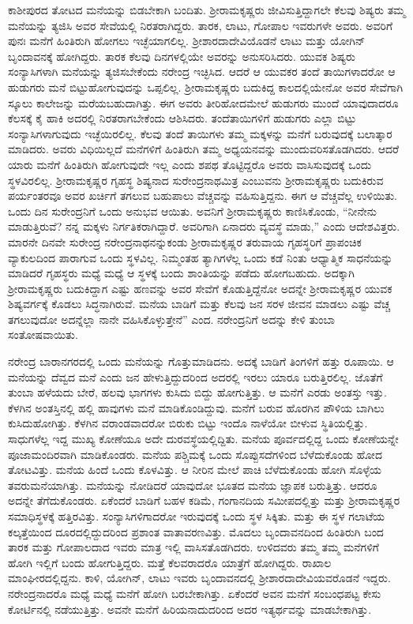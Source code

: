 ಕಾಶೀಪುರದ ತೋಟದ ಮನೆಯನ್ನು ಬಿಡಬೇಕಾಗಿ ಬಂದಿತು. ಶ‍್ರೀರಾಮಕೃಷ್ಣರು ಜೀವಿಸುತ್ತಿದ್ದಾಗಲೇ ಕೆಲವು ಶಿಷ್ಯರು ತಮ್ಮ ಮನೆಯನ್ನು ತ್ಯಜಿಸಿ ಅವರ ಸೇವೆಯಲ್ಲಿ ನಿರತರಾಗಿದ್ದರು. ತಾರಕ, ಲಾಟು, ಗೋಪಾಲ ಇವರುಗಳೇ ಅವರು. ಅವರಿಗೆ ಪುನಃ ಮನೆಗೆ ಹಿಂತಿರುಗಿ ಹೋಗಲು ಇಚ್ಛೆಯಾಗಲಿಲ್ಲ. ಶ‍್ರೀಶಾರದಾದೇವಿಯೊಡನೆ ಲಾಟು ಮತ್ತು ಯೋಗಿನ್ ಬೃಂದಾವನಕ್ಕೆ ಹೋಗಿದ್ದರು. ತಾರಕ ಕೆಲವು ದಿನಗಳಲ್ಲಿಯೇ ಅವರನ್ನು ಅನುಸರಿಸಿದರು. ಯುವಕ ಶಿಷ್ಯರು ಸಂನ್ಯಾಸಿಗಳಾಗಿ ಮನೆಯನ್ನು ತ್ಯಜಿಸಬೇಕೆಂದು ನರೇಂದ್ರ ಇಚ್ಛಿಸಿದ. ಆದರೆ ಆ ಯುವಕರ ತಂದೆ ತಾಯಿಗಳಾದರೋ ಆ ಹುಡುಗರು ಮನೆ ಬಿಟ್ಟುಹೋಗುವುದನ್ನು ಒಪ್ಪಲಿಲ್ಲ. ಶ‍್ರೀರಾಮಕೃಷ್ಣರು ಬದುಕಿದ್ದ ಕಾಲದಲ್ಲಿಯೇನೋ ಅವರ ಸೇವೆಗಾಗಿ ಸ್ಕೂಲು ಕಾಲೇಜನ್ನು ಮರೆಯಬಹುದಾಗಿತ್ತು. ಈಗ ಅವರು ತೀರಿಹೋದಮೇಲೆ ಹುಡುಗರು ಮುಂದೆ ಯಾವುದಾದರೂ ಕೆಲಸಕ್ಕೆ ಕೈ ಹಾಕಿ ಅದರಲ್ಲಿ ನಿರತರಾಗಬೇಕೆಂದು ಆಶಿಸಿದರು. ತಂದೆತಾಯಿಗಳಿಗೆ ಹುಡುಗರು ಎಲ್ಲಾ ಬಿಟ್ಟು ಸಂನ್ಯಾಸಿಗಳಾಗುವುದು ಇಚ್ಛೆಯಿರಲಿಲ್ಲ. ಕೆಲವು ತಂದೆ ತಾಯಿಗಳು ತಮ್ಮ ಮಕ್ಕಳನ್ನು ಮನೆಗೆ ಬರುವುದಕ್ಕೆ ಬಲಾತ್ಕಾರ ಮಾಡಿದರು. ಅವರು ವಿಧಿಯಿಲ್ಲದೆ ಮನೆಗಳಿಗೆ ಹಿಂತಿರುಗಿ ತಮ್ಮ ಅಧ್ಯಯನವನ್ನು ಮುಂದುವರಿಸತೊಡಗಿದರು. ಆದರೆ ಯಾರು ಮನೆಗೆ ಹಿಂತಿರುಗಿ ಹೋಗುವುದೇ ಇಲ್ಲ ಎಂದು ಶಪಥ ತೊಟ್ಟಿದ್ದರೊ ಅವರು ವಾಸಿಸುವುದಕ್ಕೆ ಒಂದು ಸ್ಥಳವಿರಲಿಲ್ಲ. ಶ‍್ರೀರಾಮಕೃಷ್ಣರ ಗೃಹಸ್ಥ ಶಿಷ್ಯನಾದ ಸುರೇಂದ್ರನಾಥಮಿತ್ರ ಎಂಬುವನು ಶ‍್ರೀರಾಮಕೃಷ್ಣರು ಬದುಕಿರುವ ಪರ್ಯಂತರವೂ ಅವರ ಖರ್ಚಿಗೆ ತಗಲುವ ಬಹುಪಾಲು ವೆಚ್ಚವನ್ನು ವಹಿಸುತ್ತಿದ್ದನು. ಈಗ ಆ ವೆಚ್ಚವೆಲ್ಲ ಉಳಿಯಿತು. ಒಂದು ದಿನ ಸುರೇಂದ್ರನಿಗೆ ಒಂದು ಅನುಭವ ಆಯಿತು. ಅವನಿಗೆ ಶ‍್ರೀರಾಮಕೃಷ್ಣರು ಕಾಣಿಸಿಕೊಂಡು, “ನೀನೇನು ಮಾಡುತ್ತಿರುವೆ? ನನ್ನ ಮಕ್ಕಳು ನಿರ್ಗತಿಕರಾಗಿದ್ದಾರೆ. ಅವರಿಗಾಗಿ ಏನಾದರು ವ್ಯವಸ್ಥೆ ಮಾಡು,” ಎಂದು ಆದೇಶವಿತ್ತರು. ಮಾರನೇ ದಿನವೇ ಸುರೇಂದ್ರ ನರೇಂದ್ರನಾಥನನ್ನು\break ಕಂಡು ಶ‍್ರೀರಾಮಕೃಷ್ಣರ ತರುವಾಯ ಗೃಹಸ್ಥರಿಗೆ ಪ್ರಾಪಂಚಿಕ ವ್ಯಾಕುಲದಿಂದ ಪಾರಾಗುವ ಒಂದು ಸ್ಥಳವಿಲ್ಲ. ನಿಮ್ಮಂತಹ ತ್ಯಾಗಿಗಳೆಲ್ಲ ಒಂದು ಕಡೆ ನಿಂತು ಆಧ್ಯಾತ್ಮಿಕ ಸಾಧನೆಯನ್ನು ಮಾಡಿದರೆ ಗೃಹಸ್ಥರು ಮಧ್ಯೆ ಮಧ್ಯೆ ಆ ಸ್ಥಳಕ್ಕೆ ಬಂದು ಶಾಂತಿಯನ್ನು ಪಡೆದು ಹೋಗಬಹುದು. ಅದಕ್ಕಾಗಿ ಶ‍್ರೀರಾಮಕೃಷ್ಣರು ಬದುಕಿದ್ದಾಗ ಎಷ್ಟು ಹಣವನ್ನು ಅವರ ಸೇವೆಗೆ ಕೊಡುತ್ತಿದ್ದೆನೋ ಅದನ್ನೇ ಶ‍್ರೀರಾಮಕೃಷ್ಣರ ಯುವಕ ಶಿಷ್ಯವರ್ಗಕ್ಕೆ ಕೊಡಲು ಸಿದ್ಧನಾಗಿರುವೆ. ಮನೆಯ ಬಾಡಿಗೆ ಮತ್ತು ಕೆಲವು ಜನ ಸರಳ ಜೀವನ ಮಾಡಲು ಎಷ್ಟು ವೆಚ್ಚ ತಗಲುವುದೋ ಅದನ್ನೆಲ್ಲಾ ನಾನೇ ವಹಿಸಿಕೊಳ್ಳುತ್ತೇನೆ” ಎಂದ. ನರೇಂದ್ರನಿಗೆ ಅದನ್ನು ಕೇಳಿ ತುಂಬಾ ಸಂತೋಷವಾಯಿತು.

ನರೇಂದ್ರ ಬಾರಾನಗರದಲ್ಲಿ ಒಂದು ಮನೆಯನ್ನು ಗೊತ್ತುಮಾಡಿದನು. ಅದಕ್ಕೆ ಬಾಡಿಗೆ ತಿಂಗಳಿಗೆ ಹತ್ತು ರೂಪಾಯಿ. ಆ ಮನೆಯನ್ನು ದೆವ್ವದ ಮನೆ ಎಂದು ಜನ ಹೇಳುತ್ತಿದ್ದುದರಿಂದ ಅದರಲ್ಲಿ ಇರಲು ಯಾರೂ ಬರುತ್ತಿರಲಿಲ್ಲ. ಜೊತೆಗೆ ತುಂಬಾ ಹಳೆಯದು ಬೇರೆ, ಹಲವು ಭಾಗಗಳು ಕುಸಿದು ಬಿದ್ದು ಹೋಗುತ್ತಿತ್ತು. ಆ ಮನೆಗೆ ಎರಡು ಅಂತಸ್ತು ಇತ್ತು. ಕೆಳಗಿನ ಅಂತಸ್ತಿನಲ್ಲಿ ಹಲ್ಲಿ ಹಾವುಗಳು ಮನೆ ಮಾಡಿಕೊಂಡಿದ್ದುವು. ಮನೆಗೆ ಬರುವ ಹೊರಗಿನ ಪೌಳಿಯ ಬಾಗಿಲು ಕುಸಿದುಹೋಗಿತ್ತು. ಕೆಳಗಿನ ವರಾಂಡವಾದರೋ ಬಿರುಕು ಬಿಟ್ಟು ಇಂದೊ ನಾಳೆಯೋ ಬೀಳುವ ಸ್ಥಿತಿಯಲ್ಲಿತ್ತು. ಸಾಧುಗಳೆಲ್ಲ ಇದ್ದ ಮುಖ್ಯ ಕೋಣೆಯೂ ಅದೇ ದುರವಸ್ಥೆಯಲ್ಲಿದ್ದಿತು. ಮನೆಯ ಪೂರ್ವದಲ್ಲಿದ್ದ ಒಂದು ಕೋಣೆಯನ್ನೇ ಪೂಜಾಮಂದಿರವಾಗಿ ಮಾಡಿಕೊಂಡರು. ಮನೆಯ ಪಶ್ಚಿಮಕ್ಕೆ ಒಂದು ಸೊಪ್ಪುಸದೆಗಳಿಂದ ಬೆಳೆದುಕೊಂಡು ಹೋದ ತೋಟವಿತ್ತು. ಮನೆಯ ಹಿಂದೆ ಒಂದು ಕೊಳವಿತ್ತು. ಆ ನೀರಿನ ಮೇಲೆ ಪಾಚಿ ಬೆಳೆದುಕೊಂಡು ಹೋಗಿ ಸೊಳ್ಳೆಯ ತವರುಮನೆಯಾಗಿತ್ತು. ಮನೆಯನ್ನು ನೋಡಿದರೆ ಯಾವುದೋ ಭೂತದ ಮನೆಯ ಜ್ಞಾಪಕ ಬರುತ್ತಿತ್ತು. ಆದರೂ ಅದನ್ನೇ ತೆಗೆದುಕೊಂಡರು. ಏಕೆಂದರೆ ಬಾಡಿಗೆ ಬಹಳ ಕಡಿಮೆ, ಗಂಗಾನದಿಯ ಸಮೀಪದಲ್ಲಿತ್ತು ಮತ್ತು ಶ‍್ರೀರಾಮಕೃಷ್ಣರ ಸಮಾಧಿಸ್ಥಳಕ್ಕೆ ಹತ್ತಿರವಿತ್ತು. ಸಂನ್ಯಾಸಿಗಳಿಗಾದರೋ ಇರುವುದಕ್ಕೆ ಒಂದು ಸ್ಥಳ ಸಿಕ್ಕಿತು. ಮತ್ತು ಈ ಸ್ಥಳ ಗಲಾಟೆಯ ಕಲ್ಕತ್ತೆಯಿಂದ ದೂರದಲ್ಲಿದ್ದುದರಿಂದ ಪ್ರಶಾಂತ ವಾತಾವರಣವಿತ್ತು. ಮೊದಲು ಬೃಂದಾವನದಿಂದ ಹಿಂತಿರುಗಿ ಬಂದ ತಾರಕ ಮತ್ತು ಗೋಪಾಲದಾದ ಇವರು ಮಾತ್ರ ಇಲ್ಲಿ ವಾಸಿಸತೊಡಗಿದರು. ಉಳಿದವರು ತಮ್ಮ ತಮ್ಮ ಮನೆಗಳಿಗೆ ಹೋಗಿ ಇಲ್ಲಿಗೆ ಬಂದು ಹೋಗುತ್ತಿದ್ದರು. ಮತ್ತೆ ಕೆಲವರಾದರೊ ಯಾತ್ರೆಗೆ ಹೋಗಿದ್ದರು. ರಾಖಾಲ ಮಾಂಘೀರದಲ್ಲಿದ್ದನು. ಕಾಳಿ, ಯೋಗಿನ್, ಲಾಟು ಇವರು ಬೃಂದಾವನದಲ್ಲಿ ಶ‍್ರೀಶಾರದಾದೇವಿಯವರೊಡನೆ ಇದ್ದರು. ನರೇಂದ್ರನಾದರೊ ಮಧ್ಯೆ ಮಧ್ಯೆ ಮನೆಗೆ ಹೋಗಿ ಬರಬೇಕಾಗಿತ್ತು. ಏಕೆಂದರೆ ಅವನ ಮನೆಗೆ ಸಂಬಂಧಪಟ್ಟ ಕೇಸು ಕೋರ್ಟಿನಲ್ಲಿ ನಡೆಯುತ್ತಿತ್ತು. ಅವನೇ ಮನೆಗೆ ಹಿರಿಯನಾದುದರಿಂದ ಅದರ ಇತ್ಯರ್ಥವನ್ನು ಮಾಡಬೇಕಾಗಿತ್ತು.

